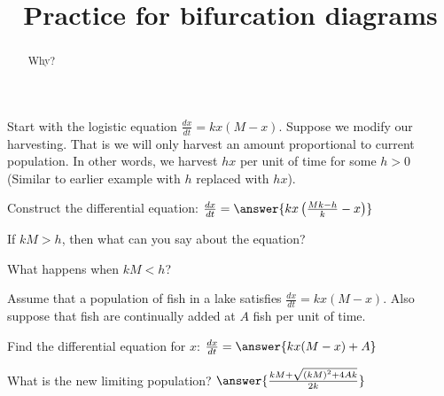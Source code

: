 \documentclass{ximera}
\title{Practice for bifurcation diagrams}
\begin{document}
\begin{abstract}
    Why?
\end{abstract}
\maketitle

\begin{exercise}
    Start with the logistic equation $\frac{dx}{dt} = kx(M-x)$. Suppose we modify our harvesting. That is we will only harvest an amount proportional to current population. In other words, we harvest $hx$ per unit of time for some $h > 0$ (Similar to earlier example with $h$ replaced with $hx$).
    
    Construct the differential equation: $\frac{dx}{dt} = \answer{kx\left(\frac{Mk-h}{k} - x\right)}$
    \begin{problem}
        If $kM > h$, then what can you say about the equation?
        \begin{multipleChoice}
        \end{multipleChoice}
        \begin{problem}
            What happens when $kM < h$?
            \begin{multipleChoice}
            \end{multipleChoice}
        \end{problem}
    \end{problem}
\end{exercise}


\begin{exercise}
    Assume that a population of fish in a lake satisfies $\frac{dx}{dt} = kx(M-x)$.  Also suppose that fish are continually added at $A$ fish per unit of time.
    
    Find the differential equation for $x$: $\frac{dx}{dt} = \answer{kx(M-x) + A}$
    \begin{problem}
        What is the new limiting population? $\answer{\frac{kM + \sqrt{{(kM)}^2 + 4Ak}}{2k}}$
    \end{problem}
\end{exercise}
\end{document}
